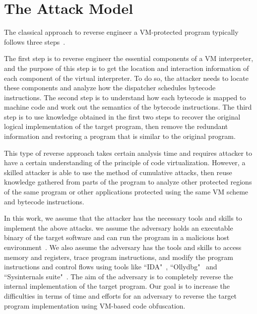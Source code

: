 \section{The Attack Model}\label{sec:attack}
The classical approach to reverse engineer a VM-protected program typically
follows three steps~\cite{10falliere2009inside,17rolles2009unpacking}. %

The first step is to reverse engineer the essential components of a VM interpreter,
and the purpose of this step is to get the location and interaction information of each
component of the virtual interpreter. To do so, the attacker needs to locate
these components and analyze how the dispatcher schedules bytecode instructions.
The second step is to understand how each bytecode is mapped to machine code
and work out the semantics of the bytecode instructions.
The third step is to use knowledge obtained in the first two steps to recover the original
logical implementation of the target program, then remove the redundant information
and restoring a program that is similar to the original program.


This type of reverse approach takes certain analysis time and requires attacker to
have a certain understanding of the principle of code virtualization.
However, a skilled attacker is able to use the method of cumulative attacks, then reuse knowledge
gathered from parts of the program to analyze other protected regions of
the same program or other applications protected using the same VM scheme and bytecode instructions.

In this work, we assume that the attacker has the necessary tools and skills to implement the above attacks.
we assume the adversary holds an executable binary of the
target software and can run the program in a malicious host
environment~\cite{11collberg2002watermarking}. We also assume the adversary
has the tools and skills to access memory and registers, trace program
instructions, and modify the program instructions and control flows using
tools like ``IDA"~\cite{14Idapro}, ``Ollydbg"~\cite{15Ollydbg} and
``Sysinternals suite"~\cite{16Sysinternalssuite}. The aim of the adversary is
to completely reverse the internal implementation of the target program.
Our goal is to increase the difficulties in terms of time and efforts for an adversary to
reverse the target program implementation using VM-based code obfuscation.